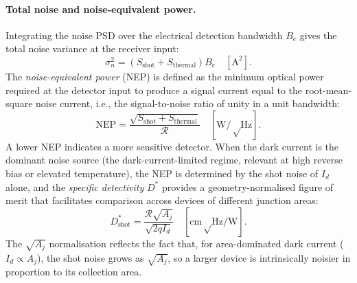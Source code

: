 \paragraph{Total noise and noise-equivalent power.}
Integrating the noise PSD over the electrical detection bandwidth $B_e$ gives
the total noise variance at the receiver input:
\begin{equation}
    \sigma_n^2 = \left(S_{\mathrm{shot}} + S_{\mathrm{thermal}}\right) B_e
    \quad [\si{\ampere\squared}].
    \label{eq:sigma_n}
\end{equation}
The \emph{noise-equivalent power} (NEP) is defined as the minimum optical power
required at the detector input to produce a signal current equal to the
root-mean-square noise current, i.e., the signal-to-noise ratio of unity in
a unit bandwidth:
\begin{equation}
    \mathrm{NEP}
    = \frac{\sqrt{S_{\mathrm{shot}} + S_{\mathrm{thermal}}}}{\mathcal{R}}
    \quad [\si{\watt\per\sqrt\hertz}].
    \label{eq:metrics_nep}
\end{equation}
A lower NEP indicates a more sensitive detector. When the dark current is the
dominant noise source (the dark-current-limited regime, relevant at high
reverse bias or elevated temperature), the NEP is determined by the shot noise
of $I_d$ alone, and the \emph{specific detectivity} $D^*$ provides a
geometry-normalised figure of merit that facilitates comparison across devices
of different junction areas:
\begin{equation}
    D^*_{\mathrm{shot}}
    = \frac{\mathcal{R}\sqrt{A_j}}{\sqrt{2qI_d}}
    \quad [\si{\centi\metre\sqrt\hertz\per\watt}].
    \label{eq:dstar}
\end{equation}
The $\sqrt{A_j}$ normalisation reflects the fact that, for area-dominated dark
current ($I_d \propto A_j$), the shot noise grows as $\sqrt{A_j}$, so a larger
device is intrinsically noisier in proportion to its collection area.

